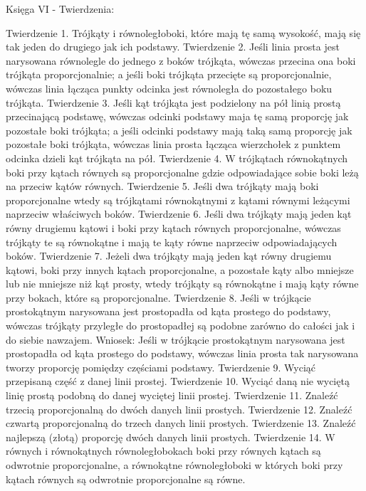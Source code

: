 Księga VI - Twierdzenia:

Twierdzenie 1.
    Trójkąty i równoległoboki, które mają tę samą wysokość, mają się tak jeden do drugiego jak ich podstawy.
Twierdzenie 2.
    Jeśli linia prosta jest narysowana równolegle do jednego z boków trójkąta, wówczas przecina ona boki trójkąta proporcjonalnie; a jeśli boki trójkąta przecięte są proporcjonalnie, wówczas linia łącząca punkty odcinka jest równoległa do pozostałego boku trójkąta.
Twierdzenie 3.
    Jeśli kąt trójkąta jest podzielony na pół linią prostą przecinającą podstawę, wówczas odcinki podstawy maja tę samą proporcję jak pozostałe boki trójkąta; a jeśli odcinki podstawy mają taką samą proporcję jak pozostałe boki trójkąta, wówczas linia prosta łącząca wierzchołek z punktem odcinka dzieli kąt trójkąta na pół.
Twierdzenie 4.
    W trójkątach równokątnych boki przy kątach równych są proporcjonalne gdzie odpowiadające sobie boki leżą na przeciw kątów równych.
Twierdzenie 5.
    Jeśli dwa trójkąty mają boki proporcjonalne wtedy są trójkątami równokątnymi z kątami równymi leżącymi naprzeciw właściwych boków.
Twierdzenie 6.
    Jeśli dwa trójkąty mają jeden kąt równy drugiemu kątowi i boki przy kątach równych proporcjonalne, wówczas trójkąty te są równokątne i mają te kąty równe naprzeciw odpowiadających boków.
Twierdzenie 7.
    Jeżeli dwa trójkąty mają jeden kąt równy drugiemu kątowi, boki przy innych kątach proporcjonalne, a pozostałe kąty albo mniejsze lub nie mniejsze niż kąt prosty, wtedy trójkąty są równokątne i mają kąty równe przy bokach, które są proporcjonalne.
Twierdzenie 8.
    Jeśli w trójkącie prostokątnym narysowana jest prostopadła od kąta prostego do podstawy, wówczas trójkąty przyległe do prostopadłej są podobne zarówno do całości jak i do siebie nawzajem.
    Wniosek:
    Jeśli w trójkącie prostokątnym narysowana jest prostopadła od kąta prostego do podstawy, wówczas linia prosta tak narysowana tworzy proporcję pomiędzy częściami podstawy.
Twierdzenie 9.
    Wyciąć przepisaną część z danej linii prostej.
Twierdzenie 10.
    Wyciąć daną nie wyciętą linię prostą podobną do danej wyciętej linii prostej.
Twierdzenie 11.
    Znaleźć trzecią proporcjonalną do dwóch danych linii prostych.
Twierdzenie 12.
    Znaleźć czwartą proporcjonalną do trzech danych linii prostych.
Twierdzenie 13.
    Znaleźć najlepszą (złotą) proporcję dwóch danych linii prostych.
Twierdzenie 14.
    W równych i równokątnych równoległobokach boki przy równych kątach są odwrotnie proporcjonalne, a równokątne równoległoboki w których boki przy kątach równych są odwrotnie proporcjonalne są równe.
